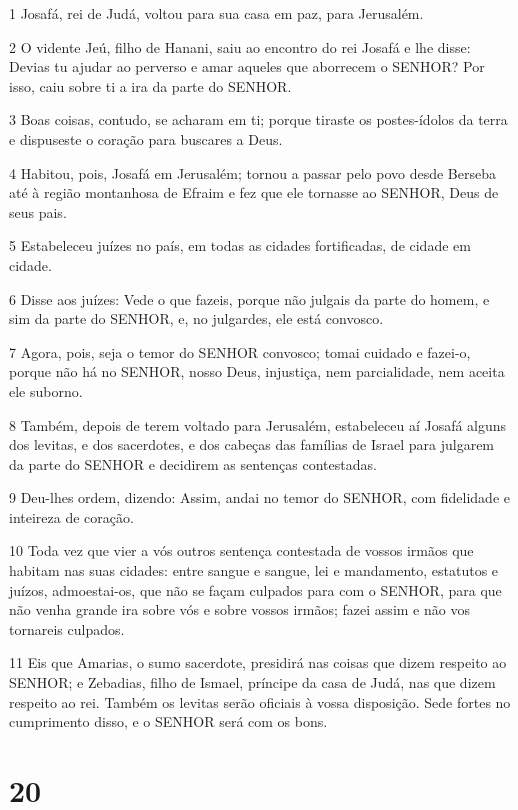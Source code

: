 \par 1 Josafá, rei de Judá, voltou para sua casa em paz, para Jerusalém.
\par 2 O vidente Jeú, filho de Hanani, saiu ao encontro do rei Josafá e lhe disse: Devias tu ajudar ao perverso e amar aqueles que aborrecem o SENHOR? Por isso, caiu sobre ti a ira da parte do SENHOR.
\par 3 Boas coisas, contudo, se acharam em ti; porque tiraste os postes-ídolos da terra e dispuseste o coração para buscares a Deus.
\par 4 Habitou, pois, Josafá em Jerusalém; tornou a passar pelo povo desde Berseba até à região montanhosa de Efraim e fez que ele tornasse ao SENHOR, Deus de seus pais.
\par 5 Estabeleceu juízes no país, em todas as cidades fortificadas, de cidade em cidade.
\par 6 Disse aos juízes: Vede o que fazeis, porque não julgais da parte do homem, e sim da parte do SENHOR, e, no julgardes, ele está convosco.
\par 7 Agora, pois, seja o temor do SENHOR convosco; tomai cuidado e fazei-o, porque não há no SENHOR, nosso Deus, injustiça, nem parcialidade, nem aceita ele suborno.
\par 8 Também, depois de terem voltado para Jerusalém, estabeleceu aí Josafá alguns dos levitas, e dos sacerdotes, e dos cabeças das famílias de Israel para julgarem da parte do SENHOR e decidirem as sentenças contestadas.
\par 9 Deu-lhes ordem, dizendo: Assim, andai no temor do SENHOR, com fidelidade e inteireza de coração.
\par 10 Toda vez que vier a vós outros sentença contestada de vossos irmãos que habitam nas suas cidades: entre sangue e sangue, lei e mandamento, estatutos e juízos, admoestai-os, que não se façam culpados para com o SENHOR, para que não venha grande ira sobre vós e sobre vossos irmãos; fazei assim e não vos tornareis culpados.
\par 11 Eis que Amarias, o sumo sacerdote, presidirá nas coisas que dizem respeito ao SENHOR; e Zebadias, filho de Ismael, príncipe da casa de Judá, nas que dizem respeito ao rei. Também os levitas serão oficiais à vossa disposição. Sede fortes no cumprimento disso, e o SENHOR será com os bons.

\chapter{20}

